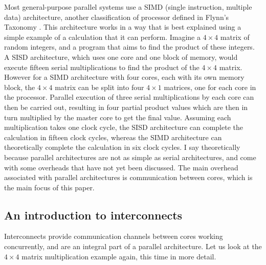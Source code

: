 \documentclass[a4paper, 12pt]{article}
\begin{document}
Most general-purpose parallel systems use a SIMD (single instruction, multiple data) architecture, another classification of processor defined in Flynn's Taxonomy \cite{Fly72}. This architecture works in a way that is best explained using a simple example of a calculation that it can perform. Imagine a $4 \times 4$ matrix of random integers, and a program that aims to find the product of these integers. A SISD architecture, which uses one core and one block of memory, would execute fifteen serial multiplications to find the product of the $4 \times 4$ matrix. However for a SIMD architecture with four cores, each with its own memory block, the $4 \times 4$ matrix can be split into four $4 \times 1$ matrices, one for each core in the processor. Parallel execution of three serial multiplications by each core can then be carried out, resulting in four partial product values which are then in turn multiplied by the master core to get the final value. Assuming each multiplication takes one clock cycle, the SISD architecture can complete the calculation in fifteen clock cycles, whereas the SIMD architecture can theoretically complete the calculation in six clock cycles. I say theoretically because parallel architectures are not as simple as serial architectures, and come with some overheads that have not yet been discussed. The main overhead associated with parallel architectures is communication between cores, which is the main focus of this paper.

\subsection{An introduction to interconnects}

Interconnects provide communication channels between cores working concurrently, and are an integral part of a parallel architecture. Let us look at the $4 \times 4$ matrix multiplication example again, this time in more detail.
\end{document}

